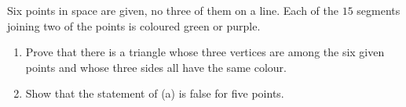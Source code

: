 Six points in space are given, no three of them on a line. Each of the $15$ segments joining two of the points is coloured green or purple.
\begin{enumerate}
\item[(a)] Prove that there is a triangle whose three vertices are among the six given points and whose three sides all have the same colour.
\item[(b)] Show that the statement of (a) is false for five points.
\end{enumerate}
